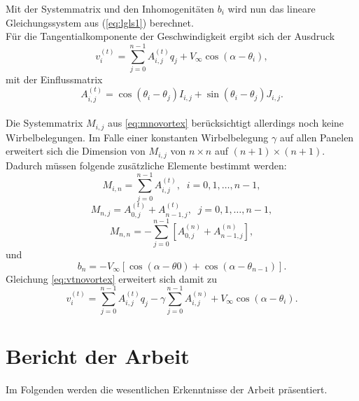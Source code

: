 Mit der Systemmatrix und den Inhomogenitäten $b_i$ wird nun das lineare Gleichungssystem aus (\ref{eq:lgls1}) berechnet. \\
Für die Tangentialkomponente der Geschwindigkeit ergibt sich der Ausdruck
\begin{equation}
\label{eq:vtnovortex}
v_i^{(t)} =  \sum_{j=0}^{n-1} A_{i,j}^{(t)} q_j + V_{\infty} \cos{(\alpha - \theta_i)},
\end{equation}
mit der Einflussmatrix
\begin{equation}
\label{eq:At}
A_{i,j}^{(t)} =  \cos{(\theta _i - \theta _j)} I_{i,j} + \sin{(\theta _i - \theta _j)} J_{i,j}.
\end{equation}
\\
Die Systemmatrix $M_{i,j}$ aus \eqref{eq:mnovortex} berücksichtigt allerdings noch keine Wirbelbelegungen. Im Falle einer konstanten Wirbelbelegung $\gamma$ auf allen Panelen erweitert sich die Dimension von $M_{i,j}$ von $n \times n$ auf $(n+1) \times (n+1)$. Dadurch müssen folgende zusätzliche Elemente bestimmt werden:
\begin{equation}
M_{i,n} =  \sum_{j=0}^{n-1} A_{i,j}^{(t)}, \;\; i=0,1,\ldots, n-1,
\end{equation}
\begin{equation}
M_{n,j} =  A_{0,j}^{(t)} + A_{n-1,j}^{(t)}, \;\; j =0,1,\ldots, n-1,
\end{equation}
\begin{equation}
M_{n,n} =  - \sum_{j=0}^{n-1} \left[ A_{0,j}^{(n)} + A_{n-1,j}^{(n)}\right],
\end{equation}
und
\begin{equation}
b_n =  -V_{\infty} [\cos{(\alpha -\theta 0)} + \cos{(\alpha -\theta _{n-1})}].
\end{equation}
Gleichung \eqref{eq:vtnovortex} erweitert sich damit zu
\begin{equation}
\label{eq:vtvortex}
v_i^{(t)} =  \sum_{j=0}^{n-1} A_{i,j}^{(t)} q_j - \gamma \sum_{j=0}^{n-1}A_{i,j}^{(n)} + V_{\infty} \cos{(\alpha - \theta_i)}.
\end{equation}
\cite{Hess:1966} \cite{Cebeci:1999}
\newpage
\chapter{Bericht der Arbeit}
Im Folgenden werden die wesentlichen Erkenntnisse der Arbeit präsentiert.
